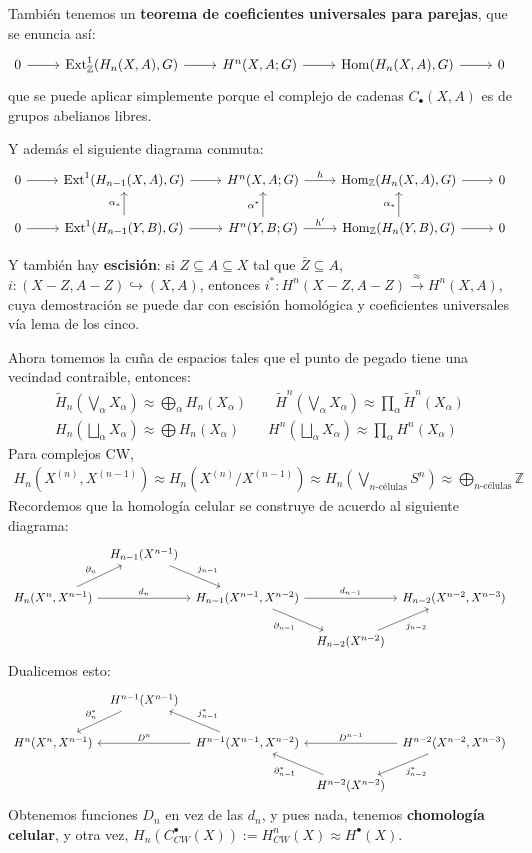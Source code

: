 \documentclass[spanish]{book}
\theoremstyle{definition}
\newcommand{\Z}{\mathbb{Z}}
\DeclareMathOperator{\Hom}{Hom}
\DeclareMathOperator{\Ext}{Ext}
\begin{document}
También tenemos un \textbf{teorema de coeficientes universales para parejas}, que se enuncia así:
\[\begin{tikzcd}
	0\arrow[r]&\Ext_\Z^1(H_n(X,A),G)\arrow[r]&H^n(X,A;G)\arrow[r]&\Hom(H_n(X,A),G)\arrow[r]&0
\end{tikzcd}\]
que se puede aplicar simplemente porque el complejo de cadenas $C_\bullet(X,A)$ es de grupos abelianos libres.

Y además el siguiente diagrama conmuta:
\[\begin{tikzcd}
	0\arrow[r]&\Ext^1(H_{n-1}(X,A),G)\arrow[r]&H^n(X,A;G)\arrow[r,"h"]&\Hom_\Z(H_n(X,A),G)\arrow[r]&0\\
	0\arrow[r]&\Ext^1(H_{n-1}(Y,B),G)\arrow[r]\arrow[u,"\alpha_*"]&H^n(Y,B;G)\arrow[r,"h'"]\arrow[u,"\alpha^*"]&\Hom_\Z(H_n(Y,B),G)\arrow[r]\arrow[u,"\alpha_*"]&0
\end{tikzcd}\]

Y también hay \textbf{escisión}: si $Z\subseteq A\subseteq X$ tal que $\bar{Z}\subseteq A$, $i: (X-Z,A-Z)\hookrightarrow (X,A)$, entonces $i^*:H^n(X-Z,A-Z)\xrightarrow{\approx}H^n(X,A)$, cuya demostración se puede dar con escisión homológica y coeficientes universales vía lema de los cinco.

Ahora tomemos la cuña de espacios tales que el punto de pegado tiene una vecindad contraible, entonces:
\begin{align*}
	\tilde{H}_n\left(\bigvee_\alpha X_\alpha\right)\approx\bigoplus_\alpha H_n(X_\alpha)\qquad\tilde{H}^n\left(\bigvee_\alpha X_\alpha\right)\approx\prod_\alpha\tilde{H}^n(X_\alpha)\\
	H_n\left(\bigsqcup_\alpha X_\alpha\right)\approx\bigoplus H_n(X_\alpha)\qquad H^n\left(\bigsqcup_\alpha X_\alpha\right)\approx\prod_\alpha H^n(X_\alpha)
\end{align*}
Para complejos CW,
\begin{align*}
	H_n(X^{(n)},X^{(n-1)})\approx H_n(X^{(n)}/X^{(n-1)})\approx H_n\left(\bigvee_{n\text{-células}}S^n\right)\approx\bigoplus_{n\text{-células}}\Z
\end{align*}
Recordemos que la homología celular se construye de acuerdo al siguiente diagrama:
\[\begin{tikzcd}[column sep=tiny]
	& H_{n-1}(X^{n-1}) \arrow[rd, "j_{n-1}"] \\
	H_n(X^n, X^{n-1}) \arrow[ru, "\partial_n"] \arrow[rr, "d_n"] && H_{n-1}(X^{n-1}, X^{n-2}) \arrow[rd,swap, "\partial_{n-1}"] \arrow[rr, "d_{n-1}"] && H_{n-2}(X^{n-2}, X^{n-3}) \\
	& && H_{n-2}(X^{n-2}) \arrow[ru,swap, "j_{n-2}"]
\end{tikzcd}\]
Dualicemos esto:
\[\begin{tikzcd}[column sep=tiny]
	& H^{n-1}(X^{n-1})\arrow[ld,swap, "\partial^*_n"] \\
	H^n(X^n, X^{n-1})   && H^{n-1}(X^{n-1}, X^{n-2})\arrow[ll,swap, "D^n"]\arrow[lu,swap, "j^*_{n-1}"]  && H^{n-2}(X^{n-2}, X^{n-3})  \arrow[ld, "j^*_{n-2}"]\arrow[ll,swap, "D^{n-1}"] \\
	& && H^{n-2}(X^{n-2})\arrow[lu, "\partial^*_{n-1}"]
\end{tikzcd}\]
Obtenemos funciones $D_n$ en vez de las $d_n$, y pues nada, tenemos \textbf{chomología celular}, y otra vez, $H_n(C_{CW}^\bullet(X)):=H_{CW}^n(X)\approx H^\bullet(X)$.
\end{document}
